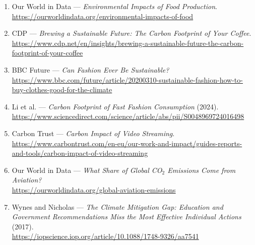 \documentclass{article}
\begin{document}
\begin{enumerate}
    \item Our World in Data --- \textit{Environmental Impacts of Food Production}.\\
    \url{https://ourworldindata.org/environmental-impacts-of-food}

    \item CDP --- \textit{Brewing a Sustainable Future: The Carbon Footprint of Your Coffee}.\\
    \url{https://www.cdp.net/en/insights/brewing-a-sustainable-future-the-carbon-footprint-of-your-coffee}

    \item BBC Future --- \textit{Can Fashion Ever Be Sustainable?}\\
    \url{https://www.bbc.com/future/article/20200310-sustainable-fashion-how-to-buy-clothes-good-for-the-climate}

    \item Li et al. --- \textit{Carbon Footprint of Fast Fashion Consumption} (2024).\\
    \url{https://www.sciencedirect.com/science/article/abs/pii/S0048969724016498}

    \item Carbon Trust --- \textit{Carbon Impact of Video Streaming}.\\
    \url{https://www.carbontrust.com/en-eu/our-work-and-impact/guides-reports-and-tools/carbon-impact-of-video-streaming}

    \item Our World in Data --- \textit{What Share of Global CO$_2$ Emissions Come from Aviation?}\\
    \url{https://ourworldindata.org/global-aviation-emissions}

    \item Wynes and Nicholas --- \textit{The Climate Mitigation Gap: Education and Government Recommendations Miss the Most Effective Individual Actions} (2017).\\
    \url{https://iopscience.iop.org/article/10.1088/1748-9326/aa7541}
\end{enumerate}
\end{document}
